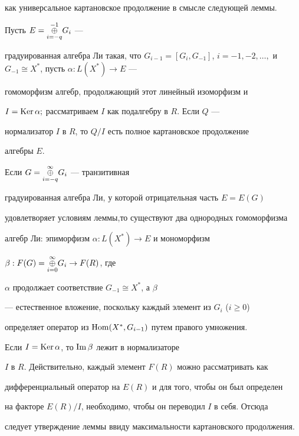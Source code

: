 как универсальное картановское продолжение в смысле следующей леммы.





\begin{lem} Пусть $E=\underset{i=-q}{\overset{-1}{\oplus}}{}G_i$ ---


градуированная алгебра Ли такая, что $G_{i-1}=[G_i,G_{-1}]$, $i=-1,-2,


\dotsc,$ и $G_{-1}\cong X^*$, пусть $\alpha : L(X^*) \to E$ --- 


гомоморфизм алгебр, продолжающий этот линейный изоморфизм и


$I=\operatorname{Ker}\alpha;$ рассматриваем $I$ как подалгебру в $R$. Если $Q$ ---


нормализатор $I$ в $R$, то $Q/I$ есть полное картановское продолжение


алгебры $E$.


\end{lem}





\begin{pf} Если $G=\underset{i=-q}{\overset{\infty }{\oplus}}{}G_i$ --- транзитивная


градуированная алгебра Ли, у которой отрицательная часть $E=E(G)$


удовлетворяет условиям леммы,то существуют два однородных гомоморфизма


алгебр Ли: эпиморфизм $\alpha : L(X^*) \to E$ и мономорфизм


$\beta : F(G) = \underset{i=0}{\overset{\infty }{\oplus}}{}G_i \to F(R)$, где


$\alpha $ продолжает соответствие $G_{-1} \cong X^*$, а $\beta$


--- естественное вложение, поскольку каждый элемент из $G_i$ ($i\ge 0$)


определяет оператор из $\operatorname{Hom} (X^*,G_{i-1})$ путем правого умножения.


Если $I=\operatorname{Ker}\alpha $, то $\operatorname{Im}\beta $ лежит в нормализаторе


$I$ в $R$. Действительно, каждый элемент $F(R)$ можно рассматривать как


дифференциальный оператор на $E(R)$ и для того, чтобы он был определен


на факторе $E(R)/I$, необходимо, чтобы он переводил $I$ в себя. Отсюда


следует утверждение леммы ввиду максимальности картановского продолжения.


\end{pf}





